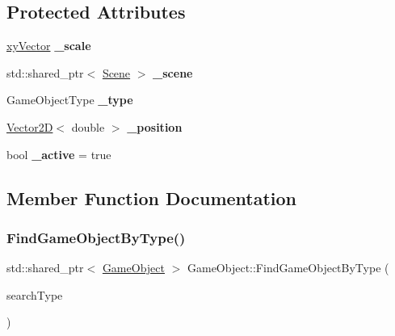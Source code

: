 \subsection*{Protected Attributes}
\begin{DoxyCompactItemize}
\item 
\mbox{\label{class_game_object_a9b76f90eef67b329538d15b4eeed67a1}} 
\hyperlink{structxy_vector}{xy\+Vector} {\bfseries \+\_\+scale}
\item 
\mbox{\label{class_game_object_ab8cae1a41ad1443d085c397b5e6d5609}} 
std\+::shared\+\_\+ptr$<$ \hyperlink{class_scene}{Scene} $>$ {\bfseries \+\_\+scene}
\item 
\mbox{\label{class_game_object_aebfec45400aff20c8eab3fbf00be0aea}} 
Game\+Object\+Type {\bfseries \+\_\+type}
\item 
\mbox{\label{class_game_object_afcd024cb6bf627118f952122861744b3}} 
\hyperlink{class_vector2_d}{Vector2D}$<$ double $>$ {\bfseries \+\_\+position}
\item 
\mbox{\label{class_game_object_aef11019578aad93f96240b79a1141a07}} 
bool {\bfseries \+\_\+active} = true
\end{DoxyCompactItemize}


\subsection{Member Function Documentation}
\mbox{\label{class_game_object_ac52291835ad2f3f36363589af0d3ae84}} 
\subsubsection{\texorpdfstring{Find\+Game\+Object\+By\+Type()}{FindGameObjectByType()}}
{\footnotesize\ttfamily std\+::shared\+\_\+ptr$<$ \hyperlink{class_game_object}{Game\+Object} $>$ Game\+Object\+::\+Find\+Game\+Object\+By\+Type (\begin{DoxyParamCaption}\item[{Game\+Object\+Type}]{search\+Type }\end{DoxyParamCaption})\hspace{0.3cm}{\ttfamily [protected]}}

